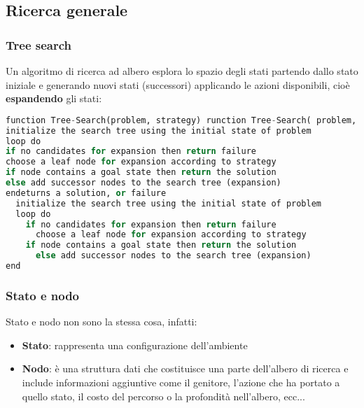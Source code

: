 \documentclass[a4paper]{article}
\begin{document}
\subsection{Ricerca generale}
\subsubsection{Tree search}
Un algoritmo di ricerca ad albero esplora lo spazio degli stati partendo dallo stato iniziale
e generando nuovi stati (successori) applicando le azioni disponibili, cioè 
\textbf{espandendo} gli stati:
\begin{lstlisting}[language=Python]
function Tree-Search(problem, strategy) runction Tree-Search( problem, strategy) returns a solution, or failure
initialize the search tree using the initial state of problem
loop do
if no candidates for expansion then return failure
choose a leaf node for expansion according to strategy
if node contains a goal state then return the solution
else add successor nodes to the search tree (expansion)
endeturns a solution, or failure
  initialize the search tree using the initial state of problem
  loop do
    if no candidates for expansion then return failure
      choose a leaf node for expansion according to strategy
    if node contains a goal state then return the solution
      else add successor nodes to the search tree (expansion)
end
\end{lstlisting}

\subsubsection{Stato e nodo}
Stato e nodo non sono la stessa cosa, infatti:
\begin{itemize}
  \item \textbf{Stato}: rappresenta una configurazione dell'ambiente
  \item \textbf{Nodo}: è una struttura dati che costituisce una parte dell'albero di ricerca
    e include informazioni aggiuntive come il genitore, l'azione che ha portato a quello stato,
    il costo del percorso o la profondità nell'albero, ecc...
\end{itemize}
\end{document}
